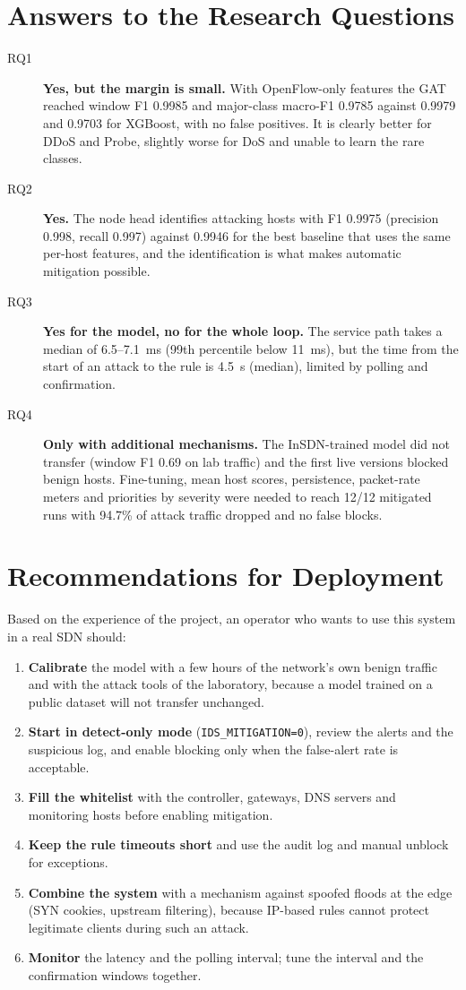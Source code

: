 \section{Answers to the Research Questions}
\begin{description}
	\item[RQ1] \textbf{Yes, but the margin is small.} With OpenFlow-only features the GAT reached window F1 0.9985 and major-class macro-F1 0.9785 against 0.9979 and 0.9703 for XGBoost, with no false positives. It is clearly better for DDoS and Probe, slightly worse for DoS and unable to learn the rare classes.
	\item[RQ2] \textbf{Yes.} The node head identifies attacking hosts with F1 0.9975 (precision 0.998, recall 0.997) against 0.9946 for the best baseline that uses the same per-host features, and the identification is what makes automatic mitigation possible.
	\item[RQ3] \textbf{Yes for the model, no for the whole loop.} The service path takes a median of 6.5--7.1~ms (99th percentile below 11~ms), but the time from the start of an attack to the rule is 4.5~s (median), limited by polling and confirmation.
	\item[RQ4] \textbf{Only with additional mechanisms.} The InSDN-trained model did not transfer (window F1 0.69 on lab traffic) and the first live versions blocked benign hosts. Fine-tuning, mean host scores, persistence, packet-rate meters and priorities by severity were needed to reach 12/12 mitigated runs with 94.7\% of attack traffic dropped and no false blocks.
\end{description}

\section{Recommendations for Deployment}
Based on the experience of the project, an operator who wants to use this system in a real SDN should:
\begin{enumerate}
	\item \textbf{Calibrate} the model with a few hours of the network's own benign traffic and with the attack tools of the laboratory, because a model trained on a public dataset will not transfer unchanged.
	\item \textbf{Start in detect-only mode} (\texttt{IDS\_MITIGATION=0}), review the alerts and the suspicious log, and enable blocking only when the false-alert rate is acceptable.
	\item \textbf{Fill the whitelist} with the controller, gateways, DNS servers and monitoring hosts before enabling mitigation.
	\item \textbf{Keep the rule timeouts short} and use the audit log and manual unblock for exceptions.
	\item \textbf{Combine the system} with a mechanism against spoofed floods at the edge (SYN cookies, upstream filtering), because IP-based rules cannot protect legitimate clients during such an attack.
	\item \textbf{Monitor} the latency and the polling interval; tune the interval and the confirmation windows together.
\end{enumerate}

